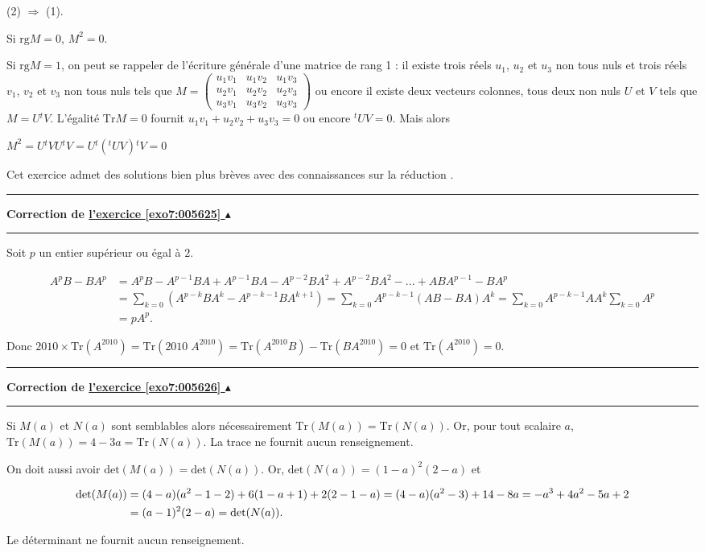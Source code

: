\documentclass[11pt,a4paper]{article}
\newcounter{exo}
\newcommand{\correction}[1]{\hypertarget{cor7:#1}{}\label{cor7:#1}{\bf Correction de \hyperlink{exo7:#1}{l'exercice \ref{exo7:#1} $\blacktriangle$}}\vspace{1mm}\hrule\vspace{1mm}}
\newcommand{\fincorrection}{\vspace{1mm}\hrule\vspace*{7mm}}
\begin{document}
(2) $\Rightarrow$ (1).

 
Si $\text{rg}M = 0$, $M^2 = 0$.

Si $\text{rg}M = 1$, on peut se rappeler de l'écriture générale d'une matrice de rang 1 : il existe trois réels $u_1$, $u_2$ et $u_3$ non tous nuls et trois réels $v_1$, $v_2$ et $v_3$ non tous nuls tels que $M=\left(
\begin{array}{ccc}
u_1v_1&u_1v_2&u_1v_3\\
u_2v_1&u_2v_2&u_2v_3\\
u_3v_1&u_3v_2&u_3v_3
\end{array}
\right)$ ou encore il existe deux vecteurs colonnes, tous deux non nuls $U$ et $V$ tels que $M=U{^t}V$. L'égalité $\text{Tr}M =0$ fournit $u_1v_1+u_2v_2+u_3v_3= 0$ ou encore ${^t}UV=0$. Mais alors

\begin{center}
$M^2=U{^t}VU{^t}V=U{^t}({^t}UV){^t}V=0$
\end{center}

Cet exercice admet des solutions bien plus brèves avec des connaissances sur la réduction .
\fincorrection
\correction{005625}
Soit $p$ un entier supérieur ou égal à $2$.

\begin{align*}
A^pB -BA^p&=A^pB-A^{p-1}BA+A^{p-1}BA-A^{p-2}BA^2+A^{p-2}BA^2-...+ABA^{p-1}-BA^p\\
 &=\sum_{k=0}^{}(A^{p-k}BA^k-A^{p-k-1}BA^{k+1})=\sum_{k=0}^{}A^{p-k-1}(AB-BA)A^k=\sum_{k=0}^{}A^{p-k-1}AA^k\sum_{k=0}^{}A^p\\
 &=pA^p.
\end{align*}

Donc $2010\times\text{Tr}(A^{2010})=\text{Tr}(2010\;A^{2010})=\text{Tr}(A^{2010}B)-\text{Tr}(BA^{2010})=0$ et $\text{Tr}(A^{2010})=0$.
\fincorrection
\correction{005626}
Si $M(a)$ et $N(a)$ sont semblables alors nécessairement $\text{Tr}(M(a))=\text{Tr}(N(a))$. Or, pour tout scalaire $a$, $\text{Tr}(M(a))=4-3a =\text{Tr}(N(a))$. La trace ne fournit aucun renseignement.

On doit aussi avoir $\text{det}(M(a))=\text{det}(N(a))$. Or, $\text{det}(N(a))=(1-a)^2(2-a)$ et 

\begin{align*}\ensuremath
\text{det}(M(a))&= (4-a)(a^2-1-2)+6(1-a+1)+2(2-1-a) = (4-a)(a^2-3)+14-8a=-a^3+4a^2-5a+2\\
 &= (a-1)^2(2-a)=\text{det}(N(a)).
\end{align*}

Le déterminant ne fournit aucun renseignement.
\end{document}
